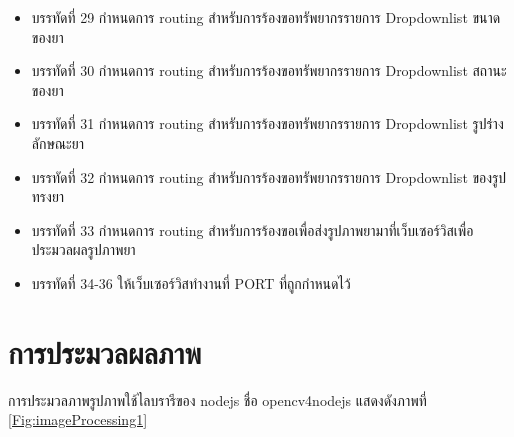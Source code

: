 \begin{itemize}[label={--}]
		\item บรรทัดที่ 29	กำหนดการ routing สำหรับการร้องขอทรัพยากรรายการ Dropdownlist ขนาดของยา
		\item บรรทัดที่ 30	กำหนดการ routing สำหรับการร้องขอทรัพยากรรายการ Dropdownlist สถานะของยา
		\item บรรทัดที่ 31	กำหนดการ routing สำหรับการร้องขอทรัพยากรรายการ Dropdownlist รูปร่างลักษณะยา
		\item บรรทัดที่ 32	กำหนดการ routing สำหรับการร้องขอทรัพยากรรายการ Dropdownlist ของรูปทรงยา
		\item บรรทัดที่ 33	กำหนดการ routing สำหรับการร้องขอเพื่อส่งรูปภาพยามาที่เว็บเซอร์วิสเพื่อประมวลผลรูปภาพยา
		\item บรรทัดที่ 34-36	ให้เว็บเซอร์วิสทำงานที่ PORT ที่ถูกกำหนดไว้
	\end{itemize}
	

\section{การประมวลผลภาพ}
	การประมวลภาพรูปภาพใช้ไลบรารีของ nodejs ชื่อ opencv4nodejs 
	แสดงดังภาพที่ \ref{Fig:imageProcessing1}

